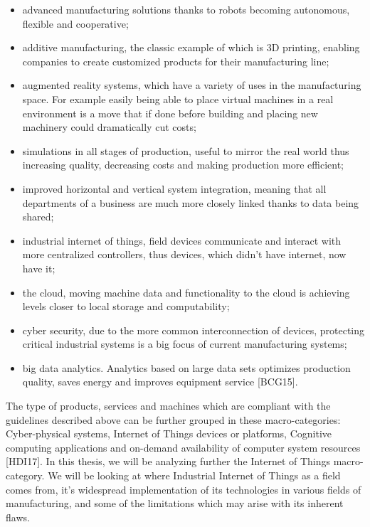 \documentclass[a4paper, 12pt]{book}
\begin{document}
\begin{itemize}
    \item advanced manufacturing solutions thanks to robots becoming autonomous, flexible and cooperative;
    \item additive manufacturing, the classic example of which is 3D printing, enabling companies to create customized products for their manufacturing line;
    \item augmented reality systems, which have a variety of uses in the manufacturing space. For example easily being able to place virtual machines in a real environment is a move that if done before building and placing new machinery could dramatically cut costs;
    \item simulations in all stages of production, useful to mirror the real world thus increasing quality, decreasing costs and making production more efficient;
    \item improved horizontal and vertical system integration, meaning that all departments of a business are much more closely linked thanks to data being shared;
    \item industrial internet of things, field devices communicate and interact with more centralized controllers, thus devices, which didn’t have internet, now have it;
    \item the cloud, moving machine data and functionality to the cloud is achieving levels closer to local storage and computability;
    \item cyber security, due to the more common interconnection of devices, protecting critical industrial systems is a big focus of current manufacturing systems;
    \item big data analytics. Analytics based on large data sets optimizes production quality, saves energy and improves equipment service [BCG15].
\end{itemize}

The type of products, services and machines which are compliant with the guidelines described above can be further grouped in these macro-categories: Cyber-physical systems, Internet of Things devices or platforms, Cognitive computing applications and on-demand availability of computer system resources [HDI17].
In this thesis, we will be analyzing further the Internet of Things macro-category. We will be looking at where Industrial Internet of Things as a field comes from, it’s widespread implementation of its technologies in various fields of manufacturing, and some of the limitations which may arise with its inherent flaws.
\end{document}
